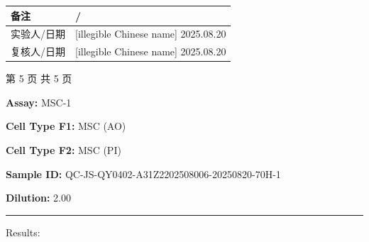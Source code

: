 \documentclass[UTF8,10pt,a4paper,fontset=fandol]{ctexart}
\newcommand{\fieldvalue}[1]{#1}
\newcommand{\handwritten}[1]{#1}
\begin{document}
\vfill

\noindent
\begin{tabular}{|p{2.0cm}|p{12.0cm}|}
\hline
备注 &
\fieldvalue{\handwritten{/}}\\
\hline
实验人/日期 &
\fieldvalue{\handwritten{[illegible Chinese name]}}
\quad
\fieldvalue{\handwritten{2025.08.20}}\\
\hline
复核人/日期 &
\fieldvalue{\handwritten{[illegible Chinese name]}}
\quad
\fieldvalue{\handwritten{2025.08.20}}\\
\hline
\end{tabular}

\begin{center}
\small 第 5 页 共 5 页
\end{center}

\newpage

\noindent
\textbf{Assay:}
\fieldvalue{MSC-1}

\vspace{0.5em}

\noindent
\textbf{Cell Type F1:}
\fieldvalue{MSC (AO)}

\noindent
\textbf{Cell Type F2:}
\fieldvalue{MSC (PI)}

\vspace{0.5em}

\noindent
\textbf{Sample ID:}
\fieldvalue{QC-JS-QY0402-A31Z2202508006-20250820-70H-1}

\noindent
\textbf{Dilution:}
\fieldvalue{2.00}

\vspace{0.5em}
\hrule
\vspace{0.3em}

\noindent
Results:

\vspace{0.5em}
\end{document}
